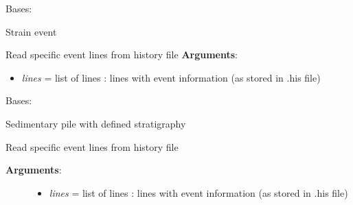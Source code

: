 \documentclass[a4paper,10pt,english]{sphinxmanual}
\begin{document}

\begin{fulllineitems}
\label{pynoddy:pynoddy.events.Strain}
Bases: {\hyperref[pynoddy:pynoddy.events.Event]{\emph{}}}

Strain event

\begin{fulllineitems}
\label{pynoddy:pynoddy.events.Strain.parse_event_lines}
Read specific event lines from history file
\textbf{Arguments}:
\begin{itemize}
\item {} 
\emph{lines} = list of lines : lines with event information (as stored in .his file)

\end{itemize}

\end{fulllineitems}


\end{fulllineitems}


\begin{fulllineitems}
\label{pynoddy:pynoddy.events.Stratigraphy}
Bases: {\hyperref[pynoddy:pynoddy.events.Event]{\emph{}}}

Sedimentary pile with defined stratigraphy

\begin{fulllineitems}
\label{pynoddy:pynoddy.events.Stratigraphy.parse_event_lines}
Read specific event lines from history file
\begin{description}
\item[{\textbf{Arguments}:}] \leavevmode\begin{itemize}
\item {} 
\emph{lines} = list of lines : lines with event information (as stored in .his file)

\end{itemize}

\end{description}

\end{fulllineitems}


\end{fulllineitems}
\end{document}
